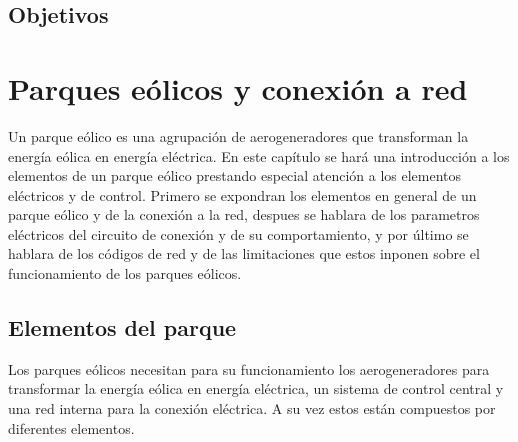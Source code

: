 \documentclass{book}
\begin{document}
	\section{Objetivos}

\chapter{Parques e\'olicos y conexi\'on a red}

Un parque e\'olico es una agrupaci\'on de aerogeneradores que transforman la energ\'ia e\'olica en energ\'ia el\'ectrica. En este cap\'itulo se har\'a una introducci\'on a los elementos de un parque e\'olico prestando especial atenci\'on a los elementos el\'ectricos y de control. Primero se expondran los elementos en general de un parque e\'olico y de la conexi\'on a la red, despues se hablara de los parametros el\'ectricos del circuito de conexi\'on y de su comportamiento, y por \'ultimo se hablara de los c\'odigos de red y de las limitaciones que estos inponen sobre el funcionamiento de los parques e\'olicos.  

	\section{Elementos del parque}
Los parques e\'olicos necesitan para su funcionamiento los aerogeneradores para transformar la energ\'ia e\'olica en energ\'ia el\'ectrica, un sistema de control central y una red interna para la conexi\'on el\'ectrica. A su vez estos est\'an compuestos por diferentes elementos.
\end{document}
